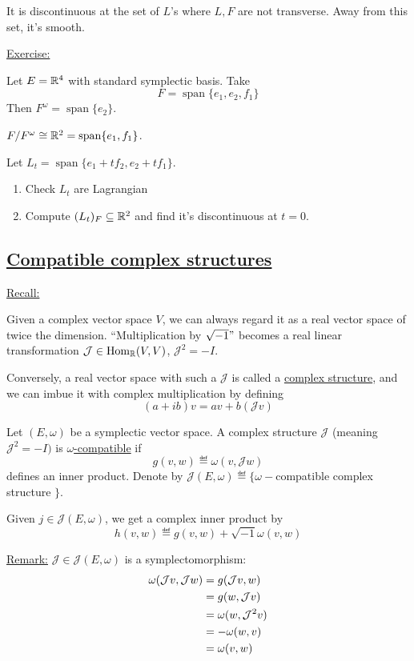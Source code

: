 \documentclass[x11names,reqno,14pt]{extarticle}
\begin{document}
It is discontinuous at the set of $L$'s where $L, F$ are not transverse. Away from this set, it's smooth. 

\underline{Exercise:}

Let $E = \mathbb{R}^4$ with standard symplectic basis. Take 
\[
F = \operatorname{span}\{e_1, e_2, f_1\}
\]
Then $F^\omega = \operatorname{span}\{e_2\}$. 

$F/F^\omega \cong \mathbb{R}^2 = \operatorname{span}\{e_1, f_1\}$. 

Let $L_t = \operatorname{span}\{e_1 + tf_2, e_2 + tf_1\}$. 
\begin{enumerate}[label=(\alph*)]

\item Check $L_t$ are Lagrangian

\item Compute $(L_t)_F \subseteq \mathbb{R}^2$ and find it's discontinuous at $t = 0$. 

\end{enumerate}

\subsection*{\underline{Compatible complex structures}}

\underline{Recall:} 

Given a complex vector space $V$, we can always regard it as a real vector space of twice the dimension. ``Multiplication by $\sqrt{-1}"$ becomes a real linear transformation $\mathcal{J} \in {\mathrm{Hom}}_{\mathbb{R}}(V,V)$, $\mathcal{J}^2 = -I$. 

Conversely, a real vector space with such a $\mathcal{J}$ is called a \underline{complex structure}, and we can imbue it with complex multiplication by defining
\[
(a + ib)v = av + b(\mathcal{J}v)
\]


Let $(E, \omega)$ be a symplectic vector space. A complex structure $\mathcal{J}$ (meaning $\mathcal{J}^2 = -I)$ is \underline{$\omega$-compatible} if 
\[
g(v, w) \eqdef \omega(v, \mathcal{J}w)
\]
defines an inner product. Denote by $\mathcal{J}(E, \omega) \eqdef \{\omega-$compatible complex structure $\}$.

Given $j \in \mathcal{J}(E, \omega)$, we get a complex inner product by 
\[
h(v, w) \eqdef g(v, w) + \sqrt{-1}\omega(v, w)
\]

\underline{Remark:} $\mathcal{J} \in \mathcal{J}(E,\omega)$ is a symplectomorphism: 
\begin{align*}
\omega(\mathcal{J}v, \mathcal{J}w) & = g(\mathcal{J}v, w) \\
& = g(w, \mathcal{J}v) \\
& = \omega(w, \mathcal{J}^2v) \\
& = -\omega(w, v)\\
& = \omega(v, w) \\
\end{align*}
\end{document}
